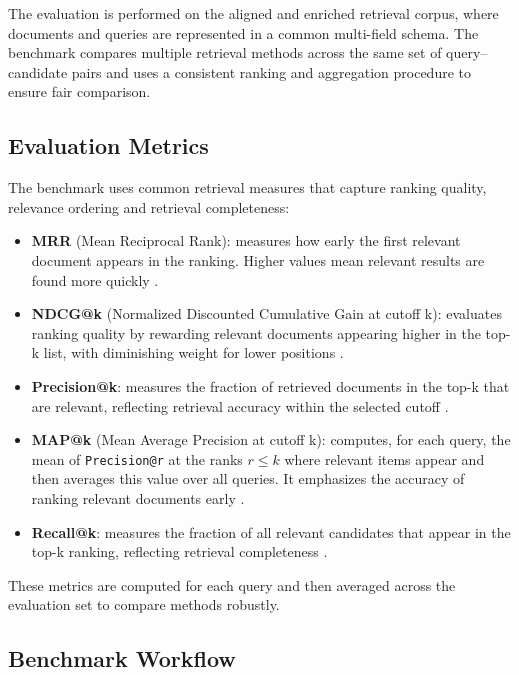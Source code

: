 \documentclass[11pt]{article}
\begin{document}
The evaluation is performed on the aligned and enriched retrieval corpus, where documents and queries are represented in a common multi-field schema. The benchmark compares multiple retrieval methods across the same set of query–candidate pairs and uses a consistent ranking and aggregation procedure to ensure fair comparison.

\subsection{Evaluation Metrics}
\label{subsec: eval metrics}
The benchmark uses common retrieval measures that capture ranking quality, relevance ordering and retrieval completeness:

\begin{itemize}
    \item \textbf{MRR} (Mean Reciprocal Rank): measures how early the first relevant document appears in the ranking. Higher values mean relevant results are found more quickly \cite{voorhees-tice-2000-trec}.
    \item \textbf{NDCG@k} (Normalized Discounted Cumulative Gain at cutoff k): evaluates ranking quality by rewarding relevant documents appearing higher in the top-k list, with diminishing weight for lower positions \cite{jarvelin_ncdg_2002}.
    \item \textbf{Precision@k}: measures the fraction of retrieved documents in the top-k that are relevant, reflecting retrieval accuracy within the selected cutoff \cite{blair_ir_1979}.
    \item \textbf{MAP@k} (Mean Average Precision at cutoff k): computes, for each query, the mean of \texttt{Precision@r} at the ranks $r \le k$ where relevant items appear and then averages this value over all queries. It emphasizes the accuracy of ranking relevant documents early \cite{voorhees-tice-2000-trec}.
    \item \textbf{Recall@k}: measures the fraction of all relevant candidates that appear in the top-k ranking, reflecting retrieval completeness \cite{blair_ir_1979}.
\end{itemize}

These metrics are computed for each query and then averaged across the evaluation set to compare methods robustly.

\subsection{Benchmark Workflow}
\end{document}
